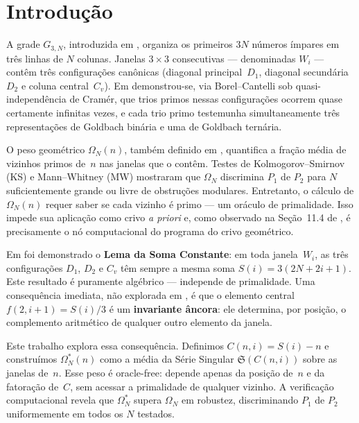 \documentclass[12pt,a4paper]{article}
\theoremstyle{definition}
\theoremstyle{remark}
\newcommand{\Grid}{G_{3,N}}
\newcommand{\Om}{\Omega_N}           %
\newcommand{\Oms}{\Omega^*_N}        %
\newcommand{\Ss}{\mathfrak{S}}       %
\begin{document}
	\tableofcontents
	\bigskip
	
	\section{Introdução}
	
	A grade $\Grid$, introduzida em \cite{bandeira2026unif}, organiza os
	primeiros $3N$ números ímpares em três linhas de $N$ colunas.
	Janelas $3\times3$ consecutivas --- denominadas $W_i$ --- contêm três
	configurações canônicas (diagonal principal~$D_1$, diagonal
	secundária~$D_2$ e coluna central~$C_v$).
	Em \cite{bandeira2026unif} demonstrou-se, via Borel--Cantelli sob
	quasi-independência de Cramér, que trios primos nessas configurações
	ocorrem quase certamente infinitas vezes, e cada trio primo testemunha
	simultaneamente três representações de Goldbach binária e uma de Goldbach
	ternária.
	
	O peso geométrico $\Om(n)$, também definido em \cite{bandeira2026unif},
	quantifica a fração média de vizinhos primos de~$n$ nas janelas que o
	contêm.
	Testes de Kolmogorov--Smirnov (KS) e Mann--Whitney (MW) mostraram que
	$\Om$ discrimina $P_1$ de $P_2$ para $N$ suficientemente grande ou livre
	de obstruções modulares.
	Entretanto, o cálculo de $\Om(n)$ requer saber se cada vizinho é primo ---
	um oráculo de primalidade.
	Isso impede sua aplicação como crivo \emph{a priori} e, como observado na
	Seção~11.4 de \cite{bandeira2026unif}, é precisamente o nó computacional
	do programa do crivo geométrico.
	
	Em \cite{bandeira2026soma} foi demonstrado o \textbf{Lema da Soma Constante}:
	em toda janela~$W_i$, as três configurações $D_1$, $D_2$ e $C_v$ têm sempre
	a mesma soma $S(i) = 3(2N+2i+1)$.
	Este resultado é puramente algébrico --- independe de primalidade.
	Uma consequência imediata, não explorada em \cite{bandeira2026soma}, é que
	o elemento central $f(2,i{+}1) = S(i)/3$ é um \textbf{invariante âncora}:
	ele determina, por posição, o complemento aritmético de qualquer outro
	elemento da janela.
	
	Este trabalho explora essa consequência.
	Definimos $C(n,i) = S(i)-n$ e construímos $\Oms(n)$ como a média da Série
	Singular $\Ss(C(n,i))$ sobre as janelas de~$n$.
	Esse peso é oracle-free: depende apenas da posição de~$n$ e da fatoração
	de~$C$, sem acessar a primalidade de qualquer vizinho.
	A verificação computacional revela que $\Oms$ supera $\Om$ em robustez,
	discriminando $P_1$ de $P_2$ uniformemente em todos os $N$ testados.
	
\end{document}
